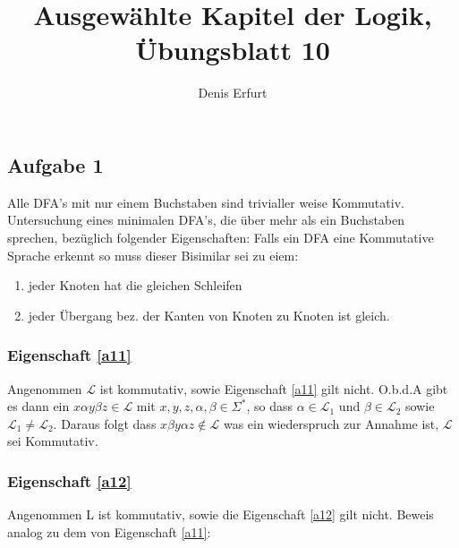 \documentclass[12pt]{article}
\begin{document}
\title{Ausgewählte Kapitel der Logik, Übungsblatt 10}
\author{Denis Erfurt}
\maketitle



\subsection*{Aufgabe 1}
%


Alle DFA's mit nur einem Buchstaben sind trivialler weise Kommutativ.
Untersuchung eines minimalen DFA's, die über mehr als ein Buchstaben sprechen,
bezüglich folgender Eigenschaften:
Falls ein DFA eine Kommutative Sprache erkennt so muss dieser Bisimilar sei zu eiem:
\begin{enumerate}
  \item jeder Knoten hat die gleichen Schleifen \label{a11}
  \item jeder Übergang bez. der Kanten von Knoten zu Knoten ist gleich. \label{a12}
\end{enumerate}

\subsubsection*{Eigenschaft \ref{a11}}
Angenommen $\mathcal{L}$ ist kommutativ, sowie Eigenschaft \ref{a11} gilt nicht.
O.b.d.A gibt es dann ein $x\alpha y\beta z\in \mathcal{L}$ mit $x,y,z,\alpha, \beta\in\Sigma^*$, so dass $\alpha\in \mathcal{L}_1$ und $\beta\in \mathcal{L}_2$ sowie $\mathcal{L}_1\neq \mathcal{L}_2$. Daraus folgt dass $x\beta y\alpha z\notin \mathcal{L}$ was
ein wiederspruch zur Annahme ist, $\mathcal{L}$ sei Kommutativ.

\subsubsection*{Eigenschaft \ref{a12}}
Angenommen L ist kommutativ, sowie die Eigenschaft \ref{a12} gilt nicht.
Beweis analog zu dem von Eigenschaft \ref{a11}:
\end{document}
